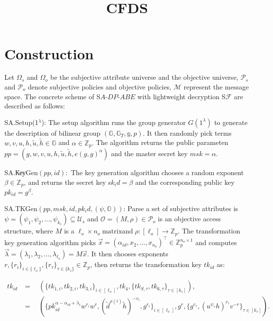 \documentclass[runningheads]{llncs}
\begin{document}
\title{CFDS}

\section{Construction}
Let $\Omega_s$ and $\Omega_o$ be the subjective attribute universe and the objective universe, $\mathcal{P}_s$ and $\mathcal{P}_o$ denote subjective policies and objective policies, $\mathcal{M}$ represent the message space. The concrete scheme of S$A$-$DP$-$ABE$ with lightweight decryption S$\mathcal{F}$ are described as follows:

SA.Setup(1$^{\lambda}$): The setup algorithm runs the group generator $G(1^\lambda)$ to generate the description of bilinear group
$(\mathbb{G},\mathbb{G}_T,\mathbb{g},p).$ It then randomly pick terms $w,v,u,h,\tilde{u},\tilde{h}\in\mathbb{G}$ and $\alpha\in\mathbb{Z}_p.$ The algorithm returns the public parameten
$pp=(g,w,v,u,h,\tilde{u},\tilde{h},e(g,g)^\alpha)$ and the master secret key $msk=\alpha.$

SA.КеуGen$(pp,id):$ The key generation algorithm chooses a random exponent $\beta\in\mathbb{Z}_p$, and returns the secret key s$k_id=\beta$
and the corresponding public key $pk_{id}= g^{\beta }$. 

SA.TKGen$(pp,msk,id,pk_id,(\psi,\mathbb{O}))$: Parse a set of subjective attributes is $\psi=(\psi_1,\psi_2,...,\psi_{k_s})\subseteq\mathcal{U}_s$ and $\mathcal{O}=(M,\rho)\in\mathcal{P}_o$ is an objective access structure, where $M$ is a $\ell_o{\operatorname*{\times}}n_o{\operatorname*{\text{matrixand}}}\rho{:}[\ell_o]{\operatorname*{\to}}\mathbb{Z}_p.$ The transformation key generation algorithm picks $\vec{x} = ( \alpha _{id}, x_2, . . . , x_{n_o}) ^\top \in \mathbb{Z} _p^{n_o\times 1}$ and computes $\vec{\lambda } = ( \lambda _1, \lambda _2, . . . , \lambda _{\ell _o}) = M\vec{x} .$ It then chooses exponents $r, \{ r_i\} _{i\in \{ \ell _o\} }, \{ r_\tau \} _{\tau \in \{ k_s\} }\in \mathbb{Z} _p$, then returns the transformation key $tk_{id}$ as:

$$\begin{aligned}tk_{id}&=\quad(\{tk_{1,i},tk_{2,i},tk_{3,i}\}_{i\in[\ell_{o}]},tk_{4},\{tk_{S,\tau},tk_{6,\tau}\}_{\tau\in[k_{s}]}),\\&=\quad(\{pk_{id}^{\alpha-\alpha_{id}+\lambda_{i}}w^{r_{i}}w^{r},(\tilde{d}^{\rho(i)}\tilde{h})^{-r_{i}},g^{r_{i}}\}_{i\in[\ell_{o}]},g^{r},\{g^{r_{\tau}},(u^{\psi_{\tau}}h)^{r_{\tau}}v^{-r}\}_{\tau\in[k_{s}]}).\end{aligned}$$
\end{document}
